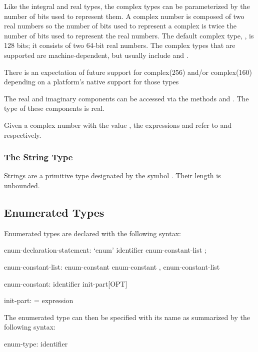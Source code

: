 Like the integral and real types, the complex types can be
parameterized by the number of bits used to represent them.  A complex
number is composed of two real numbers so the number of bits used to
represent a complex is twice the number of bits used to represent the
real numbers.  The default complex type, , is 128 bits;
it consists of two 64-bit real numbers.  The complex types that are
supported are machine-dependent, but usually
include  and .

\begin{openissue}
There is an expectation of future support for complex(256) and/or
complex(160) depending on a platform's native support for those types
\end{openissue}

The real and imaginary components can be accessed via the methods
 and .  The type of these components is real.

\begin{example}
Given a complex number  with the value , the
expressions  and  refer to 
and  respectively.
\end{example}

\subsubsection{The String Type}
\label{The_String_Type}

Strings are a primitive type designated by the symbol .
Their length is unbounded.

\subsection{Enumerated Types}
\label{Enumerated_Types}

Enumerated types are declared with the following syntax:
\begin{syntax}
enum-declaration-statement:
  `enum' identifier { enum-constant-list } ;

enum-constant-list:
  enum-constant
  enum-constant , enum-constant-list

enum-constant:
  identifier init-part[OPT]

init-part:
  = expression
\end{syntax}

The enumerated type can then be specified with its name as summarized
by the following syntax:
\begin{syntax}
enum-type:
  identifier
\end{syntax}

